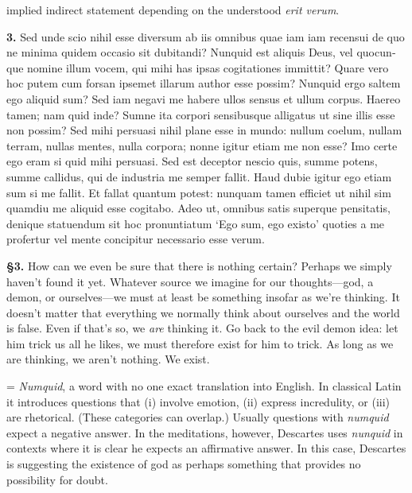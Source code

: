  implied indirect statement depending on the understood \textit{erit verum}.


\clearpage

\beginnumbering
\pstart
\begin{latin}
    \textenglish{\textbf{3.}} Sed unde scio nihil esse diversum ab iis omnibus quae iam iam recensui de quo ne minima quidem occasio sit dubitandi? Nunquid est aliquis Deus, vel quocunque nomine illum vocem, qui mihi has ipsas cogitationes immittit? Quare vero hoc putem cum forsan ipsemet illarum author esse possim? Nunquid ergo saltem ego aliquid sum? Sed iam negavi me habere ullos sensus et ullum corpus. Haereo tamen; nam quid  inde? Sumne ita corpori sensibusque alligatus ut sine illis esse non possim? Sed mihi persuasi nihil plane esse in mundo: nullum coelum, nullam terram, nullas mentes, nulla corpora; nonne igitur etiam me non esse? Imo certe ego eram si quid mihi persuasi. Sed est deceptor nescio quis, summe potens, summe callidus, qui de industria me semper fallit. Haud dubie igitur ego etiam sum si me fallit. Et fallat quantum potest: nunquam tamen efficiet ut nihil sim quamdiu me aliquid esse cogitabo. Adeo ut, omnibus satis superque pensitatis, denique statuendum sit hoc pronuntiatum `Ego sum, ego existo' quoties a me profertur vel mente concipitur necessario esse verum.
\end{latin}
\pend
\endnumbering

\prenotes

\textbf{§3.} How can we even be sure that there is nothing certain? Perhaps we simply haven't found it yet. Whatever source we imagine for our thoughts---god, a demon, or ourselves---we must at least be something insofar as we're thinking. It doesn't matter that everything we normally think about ourselves and the world is false. Even if that's so, we \textit{are} thinking it. Go back to the evil demon idea: let him trick us all he likes, we must therefore exist for him to trick. As long as we are thinking, we aren't nothing. We exist.

 = \textit{Numquid}, a word with no one exact translation into English. In classical Latin it introduces questions that (i) involve emotion, (ii) express incredulity, or (iii) are rhetorical. (These categories can overlap.) Usually questions with \textit{numquid} expect a negative answer. In the meditations, however, Descartes uses \textit{nunquid} in contexts where it is clear he expects an affirmative answer. In this case, Descartes is suggesting the existence of god as perhaps something that provides no possibility for doubt.

